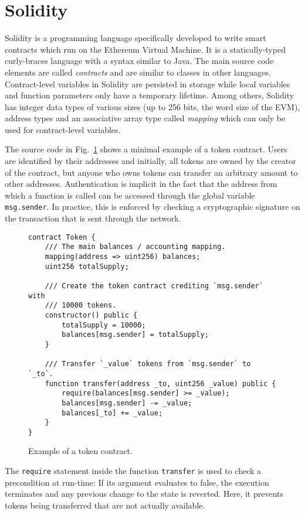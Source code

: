 \section{Solidity}
\label{section:solidity}

Solidity is a programming language specifically developed to write smart contracts
which run on the Ethereum Virtual Machine. It is a statically-typed curly-braces
language with a syntax similar to Java. The main source code elements are
called \emph{contracts} and are similar to classes in other languages.
Contract-level variables in Solidity are persisted in storage while
local variables and function parameters only have a temporary lifetime.
Among others, Solidity has integer data types of various sizes (up to 256 bits,
the word size of the EVM), address types and an associative array
type called \emph{mapping} which can only be used for contract-level variables.

The source code in Fig.~\ref{fig:tokenContract} shows a minimal example of a token contract.
Users are identified by their addresses and initially, all tokens are
owned by the creator of the contract, but
anyone who owns tokens can transfer an arbitrary amount to other addresses.
Authentication is implicit in the fact that the address from which
a function is called can be accessed through the global variable
\texttt{msg.sender}. In practice, this is enforced by checking a
cryptographic signature on the transaction that is sent through the network.

\begin{figure}
\begin{verbatim}
contract Token {
    /// The main balances / accounting mapping.
    mapping(address => uint256) balances;
    uint256 totalSupply;

    /// Create the token contract crediting `msg.sender` with
    /// 10000 tokens.
    constructor() public {
        totalSupply = 10000;
        balances[msg.sender] = totalSupply;
    }

    /// Transfer `_value` tokens from `msg.sender` to `_to`.
    function transfer(address _to, uint256 _value) public {
        require(balances[msg.sender] >= _value);
        balances[msg.sender] -= _value;
        balances[_to] += _value;
    }
}
\end{verbatim}
\caption{Example of a token contract.}
\label{fig:tokenContract}
\end{figure}

The \texttt{require} statement inside the function \texttt{transfer} is used
to check a precondition at run-time: If its argument evaluates to false,
the execution terminates and any previous change to the state is reverted.
Here, it prevents tokens being transferred that are not actually available.

